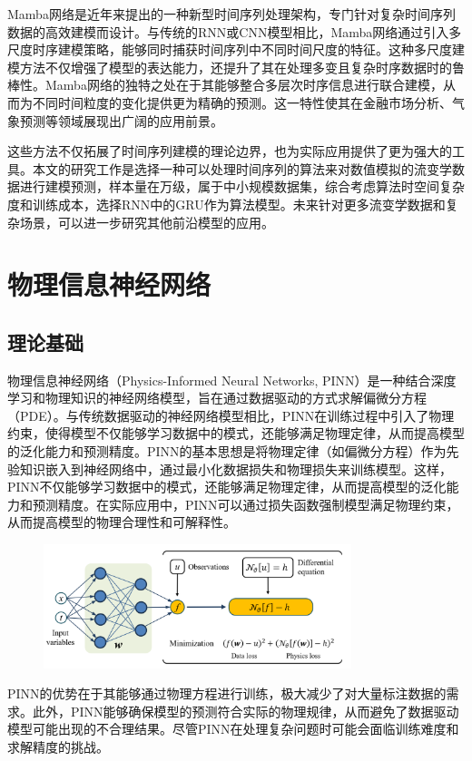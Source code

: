 Mamba网络是近年来提出的一种新型时间序列处理架构，专门针对复杂时间序列数据的高效建模而设计\cite{gu2023mamba}。与传统的RNN或CNN模型相比，Mamba网络通过引入多尺度时序建模策略，能够同时捕获时间序列中不同时间尺度的特征。这种多尺度建模方法不仅增强了模型的表达能力，还提升了其在处理多变且复杂时序数据时的鲁棒性。Mamba网络的独特之处在于其能够整合多层次时序信息进行联合建模，从而为不同时间粒度的变化提供更为精确的预测。这一特性使其在金融市场分析、气象预测等领域展现出广阔的应用前景。

这些方法不仅拓展了时间序列建模的理论边界，也为实际应用提供了更为强大的工具。本文的研究工作是选择一种可以处理时间序列的算法来对数值模拟的流变学数据进行建模预测，样本量在万级，属于中小规模数据集，综合考虑算法时空间复杂度和训练成本，选择RNN中的GRU作为算法模型。未来针对更多流变学数据和复杂场景，可以进一步研究其他前沿模型的应用。
\section{物理信息神经网络}
\subsection{理论基础}
物理信息神经网络（Physics-Informed Neural Networks, PINN）是一种结合深度学习和物理知识的神经网络模型，旨在通过数据驱动的方式求解偏微分方程（PDE）\cite{raissiPhysicsinformedNeuralNetworks2019a}。与传统数据驱动的神经网络模型相比，PINN在训练过程中引入了物理约束，使得模型不仅能够学习数据中的模式，还能够满足物理定律，从而提高模型的泛化能力和预测精度。PINN的基本思想是将物理定律（如偏微分方程）作为先验知识嵌入到神经网络中，通过最小化数据损失和物理损失来训练模型。这样，PINN不仅能够学习数据中的模式，还能够满足物理定律，从而提高模型的泛化能力和预测精度。在实际应用中，PINN可以通过损失函数强制模型满足物理约束，从而提高模型的物理合理性和可解释性。
\begin{figure}[htbp]
  \centering
  \includegraphics[width=0.8\textwidth]{Fig/pinn_logo.png}
\end{figure}
PINN的优势在于其能够通过物理方程进行训练，极大减少了对大量标注数据的需求。此外，PINN能够确保模型的预测符合实际的物理规律，从而避免了数据驱动模型可能出现的不合理结果。尽管PINN在处理复杂问题时可能会面临训练难度和求解精度的挑战。
